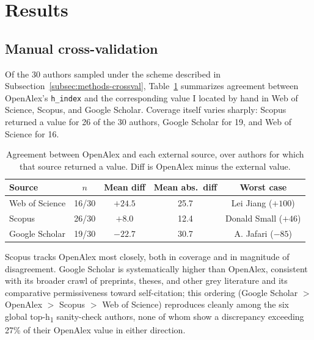 \section{Results}
\label{sec:results}

\subsection{Manual cross-validation}
\label{subsec:results-crossval}
Of the 30 authors sampled under the scheme described in Subsection~\ref{subsec:methods-crossval}, Table~\ref{tab:crossval} summarizes agreement between OpenAlex's \texttt{h\_index} and the corresponding value I located by hand in Web of Science, Scopus, and Google Scholar. Coverage itself varies sharply: Scopus returned a value for 26 of the 30 authors, Google Scholar for 19, and Web of Science for 16.

\begin{table}[h]
	\centering
	\caption{Agreement between OpenAlex and each external source, over authors for which that source returned a value. Diff is OpenAlex minus the external value.}
	\label{tab:crossval}
	\begin{tabular}{@{}lcccc@{}}
	\toprule
	Source & $n$ & Mean diff & Mean abs.\ diff & Worst case \\
	\midrule
	Web of Science & 16/30 & $+24.5$ & 25.7 & Lei Jiang ($+100$) \\
	Scopus         & 26/30 & $+8.0$  & 12.4 & Donald Small ($+46$) \\
	Google Scholar & 19/30 & $-22.7$ & 30.7 & A. Jafari ($-85$) \\
	\bottomrule
	\end{tabular}
\end{table}

Scopus tracks OpenAlex most closely, both in coverage and in magnitude of disagreement. Google Scholar is systematically higher than OpenAlex, consistent with its broader crawl of preprints, theses, and other grey literature and its comparative permissiveness toward self-citation; this ordering (Google Scholar $>$ OpenAlex $>$ Scopus $>$ Web of Science) reproduces cleanly among the six global top-h\textsubscript{1} sanity-check authors, none of whom show a discrepancy exceeding 27\% of their OpenAlex value in either direction.

